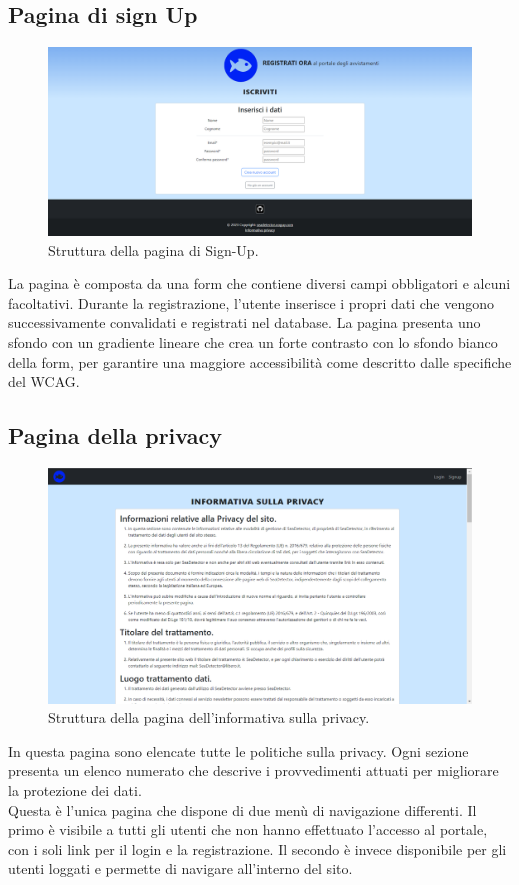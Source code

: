 \documentclass[a4paper,final,12pt]{report}
\begin{document}
\subsection{Pagina di sign Up}
\begin{figure}[hbtp]
\centering
\includegraphics[scale=0.31]{img_concettuale/signup.png}
\caption{Struttura della pagina di Sign-Up.}
\end{figure}
La pagina è composta da una form che contiene diversi campi obbligatori e alcuni facoltativi. Durante la registrazione, l'utente inserisce i propri dati che vengono successivamente convalidati e registrati nel database. La pagina presenta uno sfondo con un gradiente lineare che crea un forte contrasto con lo sfondo bianco della form, per garantire una maggiore accessibilità come descritto dalle specifiche del WCAG.

\newpage

\subsection{Pagina della privacy}
\begin{figure}[hbtp]
\centering
\includegraphics[scale=0.31]{img_concettuale/privacy.png}
\caption{Struttura della pagina dell'informativa sulla privacy.}
\end{figure}
In questa pagina sono elencate tutte le politiche sulla privacy. Ogni sezione presenta un elenco numerato che descrive i provvedimenti attuati per migliorare la protezione dei dati.\\ Questa è l'unica pagina che dispone di due menù di navigazione differenti. Il primo è visibile a tutti gli utenti che non hanno effettuato l'accesso al portale, con i soli link per il login e la registrazione. Il secondo è invece disponibile per gli utenti loggati e permette di navigare all'interno del sito.
\end{document}

